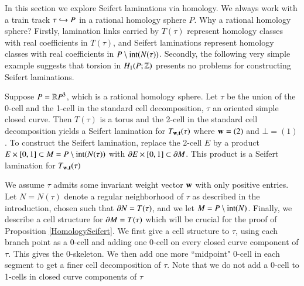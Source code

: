 \documentclass[12pt]{article}
\theoremstyle{remark}
\begin{document}
In this section we explore Seifert laminations via homology.  We always work with a train track $\tau\hookrightarrow P$ in a rational homology sphere $P$.  Why a rational homology sphere?  Firstly, lamination links carried by $T(\tau)$ represent homology classes with real coefficients in $T(\tau)$, and Seifert laminations represent homology classes with real coefficients in $P\setminus{\rm int}( N(\tau))$.  Secondly, the following very simple example suggests that torsion in $H_1(P;\mathbb Z)$ presents no problems for constructing Seifert laminations.

\begin{example}  Suppose $P=\mathbb R P^3$, which is a rational homology sphere.  Let $\tau$ be the union of the 0-cell and the 1-cell in the standard cell decomposition, $\tau$ an oriented simple closed curve.  Then $T(\tau)$ is a torus and the 2-cell in the standard cell decomposition yields a Seifert lamination for $T_{{\bf w},{\bf t}}(\tau)$ where ${\bf w}=(2)$ and $\bot=(1)$.  To construct the Seifert lamination, replace the 2-cell $E$ by a product $E\times [0,1]\subset M=P\setminus{\rm int}( N(\tau)) $ with $\partial E\times [0,1]\subset \partial M$.    This product is a Seifert lamination for $T_{{\bf w},{\bf t}}(\tau)$

\end{example}

    We assume $\tau$ admits some invariant weight vector ${\bf w}$ with only positive entries.   Let $N=N(\tau)$ denote a regular neighborhood of $\tau$ as described in the introduction, chosen such that $\partial N= T(\tau)$, and we let $M=P\setminus {\rm int}(N)$.   Finally, we describe a cell structure for $\partial M=T(\tau)$ which will be crucial for the proof of Proposition  \ref{HomologySeifert}.   We first give a cell structure to $\tau$, using each branch point as a 0-cell and adding one 0-cell on every closed curve component of $\tau$.   This gives the 0-skeleton.    We then add one more ``midpoint" 0-cell in each segment to get a finer cell decomposition of $\tau$.  Note that we do not add a 0-cell to 1-cells in closed curve components of $\tau$
\end{document}
